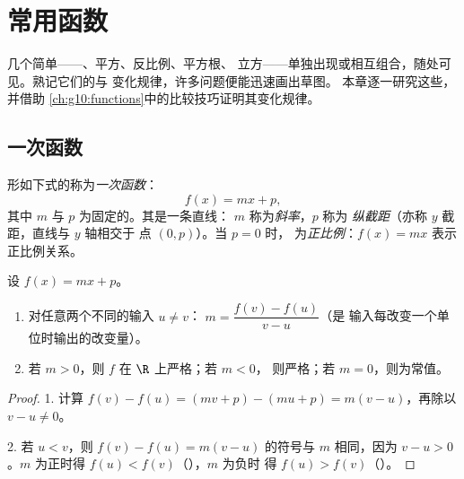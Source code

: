 \chapter{常用函数}\label{ch:g10:reffunc}

几个简单——、平方、反比例、平方根、
立方——单独出现或相互组合，随处可见。熟记它们的与
变化规律，许多问题便能迅速画出草图。
本章逐一研究这些，并借助
\cref{ch:g10:functions}中的比较技巧证明其变化规律。

\section{一次函数}

\begin{definition}[一次函数]\label{def:g10:reffunc:affine}
形如下式的称为\emph{一次函数}：
\[
f(x) = mx + p,
\]
其中 $m$ 与 $p$ 为固定的。其是一条直线：
$m$ 称为\emph{斜率}，$p$ 称为
\emph{纵截距}（亦称 $y$ 截距，直线与 $y$ 轴相交于
点 $(0, p)$）。当 $p = 0$ 时，
为\emph{正比例}：$f(x) = mx$ 表示正比例关系。
\end{definition}

\begin{proposition}[斜率与单调性]\label{prop:g10:reffunc:affine}
设 $f(x) = mx + p$。
\begin{enumerate}
  \item 对任意两个不同的输入 $u \neq v$：
        $m = \dfrac{f(v) - f(u)}{v - u}$（是
        输入每改变一个单位时输出的改变量）。
  \item 若 $m > 0$，则 $f$ 在 $\R$ 上严格；若 $m < 0$，
        则严格；若 $m = 0$，则为常值。
\end{enumerate}
\end{proposition}

\begin{proof}
1. 计算 $f(v) - f(u) = (mv + p) - (mu + p) = m(v - u)$，再除以
$v - u \neq 0$。

2. 若 $u < v$，则 $f(v) - f(u) = m(v-u)$ 的符号与 $m$ 相同，因为
$v - u > 0$。$m$ 为正时得 $f(u) < f(v)$（），$m$ 为负时
得 $f(u) > f(v)$（）。
\end{proof}

